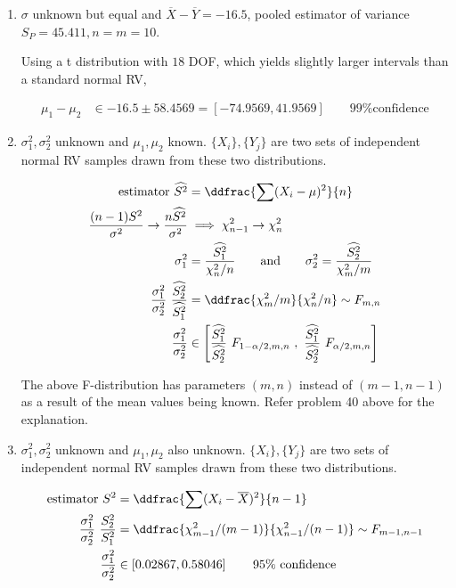 \begin{enumerate}
	
	
	\item  $ \sigma $ unknown but equal and $ \overline{X} - \overline{Y} = -16.5 $, pooled estimator of variance $ S_P = 45.411, n = m = 10$.
	
	Using a t distribution with $ 18 $ DOF, which yields slightly larger intervals than a standard normal RV,
	
		\begin{align}		
			\mu_1 - \mu_2 &\in -16.5 \pm 58.4569 = [-74.9569, 41.9569] \qquad \text{99\% confidence}
		\end{align}
	
	
	\item  $ \sigma_1^2, \sigma_2^2 $ unknown and $ \mu_1, \mu_2 $ known. $ \{X_i\}, \{Y_j\} $ are two sets of independent normal RV samples drawn from these two distributions.
	
	
		\begin{align}		
			\text{estimator } \widehat{S^2} &= \ddfrac{\sum (X_i - \mu)^2}{n} \nonumber \\
			\frac{(n-1)S^2}{\sigma^2} \to \frac{n\widehat{S^2}}{\sigma^2} &\implies \chi^2_{n-1} \to \chi^2_{n} \nonumber \\
			\sigma_1^2 &= \frac{\widehat{S_1^2}}{\chi_n^2/n} \qquad \text{and} \qquad \sigma_2^2 = \frac{\widehat{S_2^2}}{\chi_m^2/m} \\
			\frac{\sigma_1^2}{\sigma_2^2}\ \frac{\widehat{S_2^2}}{\widehat{S_1^2}} &= \ddfrac{\chi_m^2/m}{\chi_n^2/n} \sim F_{m, n} \\
			\frac{\sigma_1^2}{\sigma_2^2} &\in \left[ \frac{\widehat{S_1^2}}{\widehat{S_2^2}}\ F_{1 - \alpha/2, m, n}\ ,\ \frac{\widehat{S_1^2}}{\widehat{S_2^2}}\ F_{\alpha/2, m, n} \right]
		\end{align}
		
		The above F-distribution has parameters $ (m, n) $ instead of $ (m-1, n-1) $ as a result of the mean values being known. Refer problem 40 above for the explanation.
	
	
	\item  $ \sigma_1^2, \sigma_2^2 $ unknown and $ \mu_1, \mu_2 $ also unknown. $ \{X_i\}, \{Y_j\} $ are two sets of independent normal RV samples drawn from these two distributions.
	
	
		\begin{align}		
			\text{estimator } S^2 &= \ddfrac{\sum (X_i - \overline{X})^2}{n-1} \nonumber \\
			\frac{\sigma_1^2}{\sigma_2^2}\ \frac{S_2^2}{S_1^2} &= \ddfrac{\chi_{m-1}^2/(m-1)}{\chi_{n-1}^2/(n-1)} \sim F_{m-1, n-1} \\
			\frac{\sigma_1^2}{\sigma_2^2} &\in \left[0.02867, 0.58046\right] \qquad \text{95\% confidence}
		\end{align}
	

\end{enumerate}
